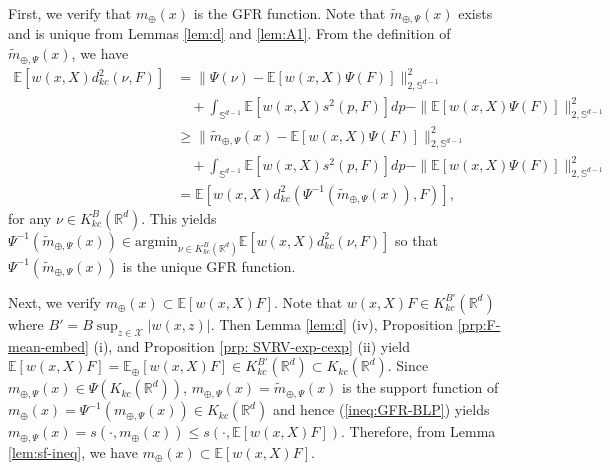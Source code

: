 \documentclass[11pt,reqno]{amsart}
\begin{document}
First, we verify that $m_\oplus(x)$ is the GFR function. Note that $\widetilde{m}_{\oplus,\Psi}(x)$ exists and is unique from Lemmas \ref{lem:d} and \ref{lem:A1}. From the definition of $\widetilde{m}_{\oplus,\Psi}(x)$, we have
\begin{align*}
\mathbb{E}[w(x,X)d_{kc}^2(\nu, F)]
&= \|\Psi(\nu) -\mathbb{E}[w(x,X)\Psi(F)]\|_{2,\mathbb{S}^{d-1}}^2\\
&\quad + \int_{\mathbb{S}^{d-1}}\mathbb{E}[w(x,X)s^2(p,F)]dp-\|\mathbb{E}[w(x,X)\Psi(F)]\|_{2,\mathbb{S}^{d-1}}^2\\
&\geq \|\widetilde{m}_{\oplus,\Psi}(x) - \mathbb{E}[w(x,X)\Psi(F)]\|_{2,\mathbb{S}^{d-1}}^2\\
&\quad + \int_{\mathbb{S}^{d-1}}\mathbb{E}[w(x,X)s^2(p,F)]dp-\|\mathbb{E}[w(x,X)\Psi(F)]\|_{2,\mathbb{S}^{d-1}}^2\\
&=\mathbb{E}[w(x,X)d_{kc}^2(\Psi^{-1}(\tilde{m}_{\oplus,\Psi}(x)), F)],
\end{align*}
for any $\nu \in K_{kc}^B(\mathbb{R}^d)$. This yields $\Psi^{-1}(\widetilde{m}_{\oplus,\Psi}(x)) \in \mathrm{argmin}_{\nu \in K_{kc}^B(\mathbb{R}^d)}\mathbb{E}[w(x,X)d_{kc}^2(\nu,F)]$ so that $\Psi^{-1}(\widetilde{m}_{\oplus,\Psi}(x))$ is the unique GFR function. 

Next, we verify $m_\oplus(x) \subset \mathbb{E}[w(x,X)F]$. Note that $w(x,X)F \in K_{kc}^{B'}(\mathbb{R}^d)$ where $B'=B\sup_{z \in \mathcal{X}}|w(x,z)|$. Then Lemma \ref{lem:d} (iv), Proposition \ref{prp:F-mean-embed} (i), and Proposition \ref{prp: SVRV-exp-cexp} (ii) yield $\mathbb{E}[w(x,X)F] = \mathbb{E}_\oplus[w(x,X)F] \in K_{kc}^{B'}(\mathbb{R}^d) \subset K_{kc}(\mathbb{R}^d)$. Since $m_{\oplus,\Psi}(x) \in \Psi(K_{kc}(\mathbb{R}^d))$, $m_{\oplus,\Psi}(x) = \widetilde{m}_{\oplus,\Psi}(x)$ is the support function of $m_\oplus(x)=\Psi^{-1}(m_{\oplus,\Psi}(x)) \in K_{kc}(\mathbb{R}^d)$ and hence (\ref{ineq:GFR-BLP}) yields $m_{\oplus,\Psi}(x)=s(\cdot,m_\oplus(x))\leq s(\cdot, \mathbb{E}[w(x,X)F])$. Therefore, from Lemma \ref{lem:sf-ineq}, we have $m_\oplus(x) \subset \mathbb{E}[w(x,X)F]$. 
\end{document}
